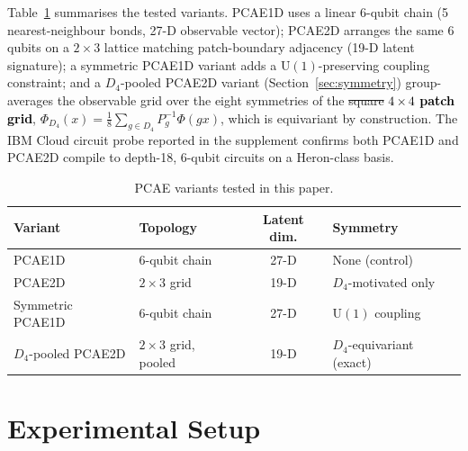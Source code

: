 \documentclass[pdflatex,sn-basic]{sn-jnl}
\newcommand{\del}[1]{\sout{#1}}
\newcommand{\add}[1]{\textbf{\textcolor{black}{#1}}}
\begin{document}
Table~\ref{tab:variants} summarises the tested variants. PCAE1D uses a linear
6-qubit chain (5 nearest-neighbour bonds, 27-D observable vector); PCAE2D arranges
the same 6 qubits on a $2\times3$ lattice matching patch-boundary adjacency
(19-D latent signature); a symmetric PCAE1D variant adds a
$\mathrm{U}(1)$-preserving coupling constraint; and a $D_4$-pooled PCAE2D variant
(Section~\ref{sec:symmetry}) group-averages the observable grid over the eight
symmetries of the \del{square} \add{$4\times4$ patch grid},
$\Phi_{D_4}(x)=\tfrac{1}{8}\sum_{g\in D_4}P_g^{-1}\Phi(gx)$, which is equivariant
by construction. The IBM Cloud circuit probe reported in the supplement confirms
both PCAE1D and PCAE2D compile to depth-18, 6-qubit circuits on a Heron-class
basis.
\color{black}

\begin{table}[t]
  \centering
  \caption{PCAE variants tested in this paper.}
  \label{tab:variants}
  \begin{tabular}{@{}l l c l@{}}
    \toprule
    Variant                 & Topology                  & Latent dim. & Symmetry \\
    \midrule
    PCAE1D                   & 6-qubit chain             & 27-D        & None (control)            \\
    PCAE2D                   & $2\times3$ grid           & 19-D        & $D_4$-motivated only      \\
    Symmetric PCAE1D         & 6-qubit chain             & 27-D        & $\mathrm{U}(1)$ coupling  \\
    $D_4$-pooled PCAE2D      & $2\times3$ grid, pooled   & 19-D        & $D_4$-equivariant (exact) \\
    \bottomrule
  \end{tabular}
\end{table}

\section{Experimental Setup}
\label{sec:protocol}
\end{document}
